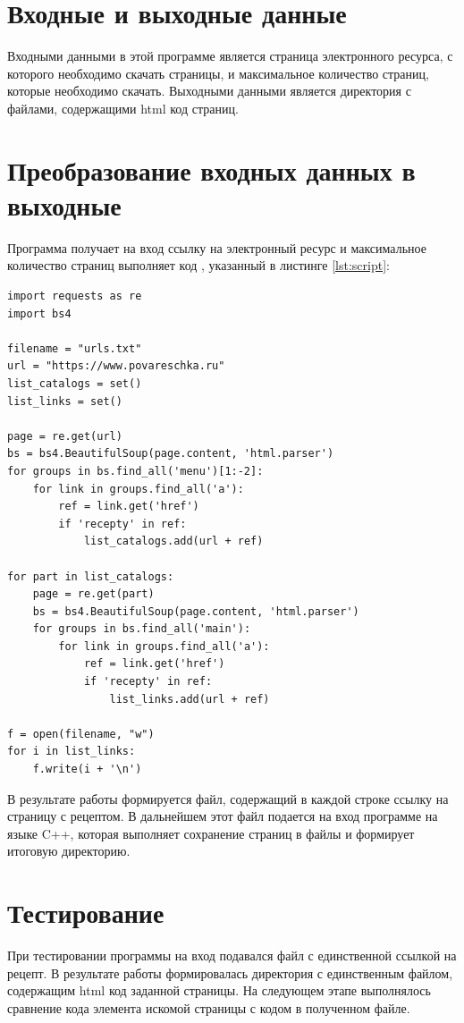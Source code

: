 \documentclass{article}
\begin{document}
\clearpage\section{Входные и выходные данные}
Входными данными в этой программе является страница электронного ресурса, с которого необходимо скачать страницы, и
максимальное количество страниц, которые необходимо скачать. Выходными данными является директория с файлами,
содержащими html код страниц.

\clearpage\section{Преобразование входных данных в выходные}
Программа получает на вход ссылку на электронный ресурс и максимальное количество страниц выполняет код , указанный в
листинге \ref{lst:script}:
\begin{lstlisting}[style=python, label=lst:script,caption=Скрипт на языке Python$^{[5]}$ для получения файла ссылок ля дальнейшей обработки]
import requests as re
import bs4

filename = "urls.txt"
url = "https://www.povareschka.ru"
list_catalogs = set()
list_links = set()

page = re.get(url)
bs = bs4.BeautifulSoup(page.content, 'html.parser')
for groups in bs.find_all('menu')[1:-2]:
    for link in groups.find_all('a'):
        ref = link.get('href')
        if 'recepty' in ref:
            list_catalogs.add(url + ref)

for part in list_catalogs:
    page = re.get(part)
    bs = bs4.BeautifulSoup(page.content, 'html.parser')
    for groups in bs.find_all('main'):
        for link in groups.find_all('a'):
            ref = link.get('href')
            if 'recepty' in ref:
                list_links.add(url + ref)

f = open(filename, "w")
for i in list_links:
    f.write(i + '\n')
\end{lstlisting}

В результате работы формируется файл, содержащий в каждой строке ссылку на страницу с рецептом. В дальнейшем этот файл
подается на вход программе на языке C++, которая выполняет сохранение страниц в файлы и формирует итоговую директорию.

\clearpage\section{Тестирование}
При тестировании программы на вход подавался файл с единственной ссылкой на рецепт. В результате работы 
формировалась директория с единственным файлом, содержащим html код заданной страницы. На следующем этапе 
выполнялось сравнение кода элемента искомой страницы с кодом в полученном файле.
\end{document}

